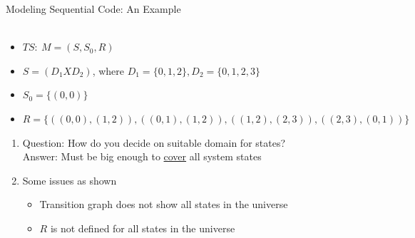 \documentclass{beamer}
\begin{document}
\begin{frame}{Modeling Sequential Code: An Example}
\hfill
{} \\
 \\

\tiny
\begin{itemize}
\item<3->  $TS:~M = (S, S_0, R)$
\item<3-> $S = (D_1 X D_2)$, where $D_1 = \{0,1,2\}, D_2 = \{0,1,2,3\}$
\item<3-> $S_0 = \{(0,0)\}$
\item<3-> $R = \{ ((0,0),(1,2)), ((0,1),(1,2)), ((1,2),(2,3)), ((2,3),(0,1))  \}$
\end{itemize}
\tiny
\begin{enumerate}
\item<4-> Question: How do you decide on suitable domain for states? \\
Answer: Must be big enough to \underline{cover} all system states
\item <4-> Some issues as shown
\begin{itemize}
\tiny
\item<4-> Transition graph does not show all states in the universe
\item<4-> $R$ is not defined for all states in the universe
\end{itemize}
\end{enumerate}
\end{frame}
\end{document}
